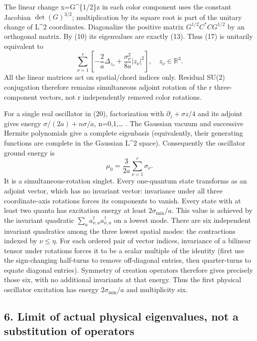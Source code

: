 \documentclass[
  11pt,
]{article}
\begin{document}
The linear change x=G\^{}\{1/2\}z in each color component uses the
constant Jacobian \(\det(G)^{3/2}\); multiplication by its square root
is part of the unitary change of L\^{}2 coordinates. Diagonalize the
positive matrix \(G^{1/2}C^*CG^{1/2}\) by an orthogonal matrix. By (10)
its eigenvalues are exactly (13). Thus (17) is unitarily equivalent to
\[
 \sum_{\nu=1}^r\left[-\frac2a\Delta_{z_\nu}
                    +\frac{\sigma_\nu^2}{8a}|z_\nu|^2\right],
                  \quad z_\nu\in\mathbb R^3.
\tag{20}
\] All the linear matrices act on spatial/chord indices only. Residual
SU(2) conjugation therefore remains simultaneous adjoint rotation of the
r three-component vectors, not r independently removed color rotations.

For a single real oscillator in (20), factorization with
\(\partial_z+\sigma z/4\) and its adjoint gives energy
\(\sigma/(2a)+n\sigma/a\), n=0,1,\ldots{} . The Gaussian vacuum and
successive Hermite polynomials give a complete eigenbasis (equivalently,
their generating functions are complete in the Gaussian L\^{}2 space).
Consequently the oscillator ground energy is \[
 \mu_0=\frac3{2a}\sum_{\nu=1}^r\sigma_\nu.
\tag{21}
\] It is a simultaneous-rotation singlet. Every one-quantum state
transforms as an adjoint vector, which has no invariant vector:
invariance under all three coordinate-axis rotations forces its
components to vanish. Every state with at least two quanta has
excitation energy at least \(2\sigma_{\min}/a\). This value is achieved
by the invariant quadratic \(\sum_a a^\dagger_{\nu,a}a^\dagger_{\nu,a}\)
on a lowest mode. There are six independent invariant quadratics among
the three lowest spatial modes: the contractions indexed by
\(\nu\le\eta\). For each ordered pair of vector indices, invariance of a
bilinear tensor under rotations forces it to be a scalar multiple of the
identity (first use the sign-changing half-turns to remove off-diagonal
entries, then quarter-turns to equate diagonal entries). Symmetry of
creation operators therefore gives precisely those six, with no
additional invariants at that energy. Thus the first physical oscillator
excitation has energy \(2\sigma_{\min}/a\) and multiplicity six.

\subsection{6. Limit of actual physical eigenvalues, not a substitution
of
operators}\label{weak-coupling-part-1-limit-of-actual-physical-eigenvalues-not-a-substitution-of-operators}
\end{document}
